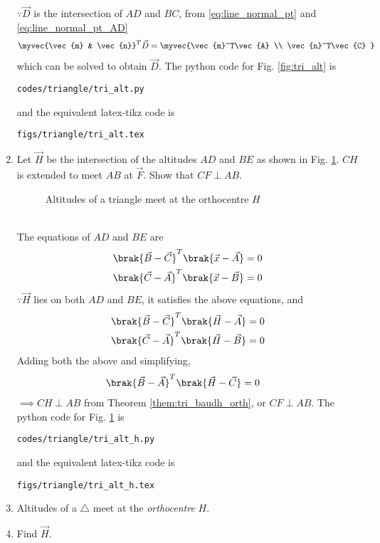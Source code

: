 \begin{enumerate}[label=\arabic*.,ref=\thesubsection.\theenumi]
%
$\because \vec{D}$ is the intersection of $AD$ and $BC$, from \eqref{eq:line_normal_pt} and \eqref{eq:line_normal_pt_AD}
%
\begin{align}
\myvec{\vec{m} & \vec{n}}^T \vec{D}= \myvec{\vec{m}^T\vec{A} \\ \vec{n}^T\vec{C} }
\label{eq:alt_D_mat}
\end{align}
%
which can be solved to obtain $\vec{D}$.
%
The python code for  Fig. \ref{fig:tri_alt} is
\begin{lstlisting}
codes/triangle/tri_alt.py
\end{lstlisting}
%
and the equivalent latex-tikz code is
%
\begin{lstlisting}
figs/triangle/tri_alt.tex
\end{lstlisting}
%
\item Let $\vec{H}$ be the intersection of the altitudes $AD$ and $BE$ as shown in Fig. \ref{fig:tri_alt_h}.  $CH$ is extended to meet $AB$ at $\vec{F}$.  Show that $CF \perp AB$.
%
\begin{figure}[!ht]
	\begin{center}
		\resizebox{\columnwidth}{!}{}
	\end{center}
	\caption{Altitudes of a triangle meet at the orthocentre $H$}
	\label{fig:tri_alt_h}	
\end{figure}
%
\\
\solution The equations of $AD$ and $BE$ are 
%
\begin{align}
\brak{\vec{B}-\vec{C}}^T\brak{\vec{x}-\vec{A}} &= 0  
\\
\brak{\vec{C}-\vec{A}}^T\brak{\vec{x}-\vec{B}} &= 0  
\end{align}
%
 $\because \vec{H}$ lies on both $AD$ and $BE$, it satisfies the above equations, and 
%
\begin{align}
\brak{\vec{B}-\vec{C}}^T\brak{\vec{H}-\vec{A}} &= 0  
\\
\brak{\vec{C}-\vec{A}}^T\brak{\vec{H}-\vec{B}} &= 0  
\end{align}
%
Adding both the above and simplifying, 
%
\begin{align}
\brak{\vec{B}-\vec{A}}^T\brak{\vec{H}-\vec{C}} &= 0  
\end{align}
%
$\implies CH \perp AB$ from Theorem \ref{them:tri_baudh_orth}, or $CF \perp AB$.  
%
The python code for  Fig. \ref{fig:tri_alt_h} is
\begin{lstlisting}
codes/triangle/tri_alt_h.py
\end{lstlisting}
%
and the equivalent latex-tikz code is
%
\begin{lstlisting}
figs/triangle/tri_alt_h.tex
\end{lstlisting}

\item Altitudes of a $\triangle$ meet at the {\em orthocentre} $H$.
%
\item Find $\vec{H}$.
\end{enumerate}
